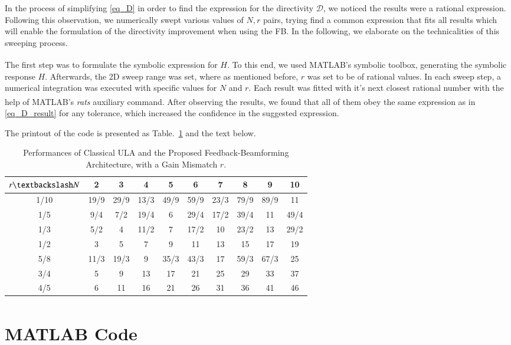 In the process of simplifying \eqref{eq_D} in order to find the expression for the directivity $\mathcal{D}$, we noticed the results were a rational expression.
Following this observation, we numerically swept various values of $N,r$ pairs, trying find a common expression that fits all results which will enable the formulation of the directivity improvement when using the FB.
In the following, we elaborate on the technicalities of this sweeping process.
\par The first step was to formulate the symbolic expression for $H$.
To this end, we used MATLAB\textsuperscript{\textregistered}'s symbolic toolbox, generating the symbolic response $H$.
Afterwards, the 2D sweep range was set, where as mentioned before, $r$ was set to be of rational values.
In each sweep step, a numerical integration was executed with specific values for $N$ and $r$.
Each result was fitted with it's next closest rational number with the help of MATLAB\textsuperscript{\textregistered}'s \emph{rats} auxiliary command.
After observing the results, we found that all of them obey the same expression as in \eqref{eq_D_result} for any tolerance, which increased the confidence in the suggested expression.
\par The printout of the code is presented as Table.~\ref{table_D} and the text below.
\begin{table}[h!]
    \caption{Performances of Classical ULA and the Proposed Feedback-Beamforming Architecture, with a Gain Mismatch $r$.}
    \centering
    {
        \begin{tabular}{||c c c c c c c c c c||}
            \hline
            $r \textbackslash N$ & 2 & 3 & 4 & 5 & 6 & 7 & 8 & 9 & 10 \\ [0.5ex] 
            \hline\hline
            1/10     & 19/9  & 29/9  & 13/3  & 49/9  & 59/9  & 23/3  & 79/9  & 89/9  & 11   \\ [1ex] 
            1/5      & 9/4   & 7/2   & 19/4  & 6     & 29/4  & 17/2  & 39/4  & 11    & 49/4 \\ [1ex] 
            1/3      & 5/2   & 4     & 11/2  & 7     & 17/2  & 10    & 23/2  & 13    & 29/2 \\ [1ex] 
            1/2      & 3     & 5     & 7     & 9     & 11    & 13    & 15    & 17    & 19   \\ [1ex] 
            5/8      & 11/3  & 19/3  & 9     & 35/3  & 43/3  & 17    & 59/3  & 67/3  & 25   \\ [1ex] 
            3/4      & 5     & 9     & 13    & 17    & 21    & 25    & 29    & 33    & 37   \\ [1ex] 
            4/5      & 6     & 11    & 16    & 21    & 26    & 31    & 36    & 41    & 46   \\ [1ex] 
            \hline
         \end{tabular}
     }
    \label{table_D}
\end{table}
\section*{MATLAB\textsuperscript{\textregistered} Code}


